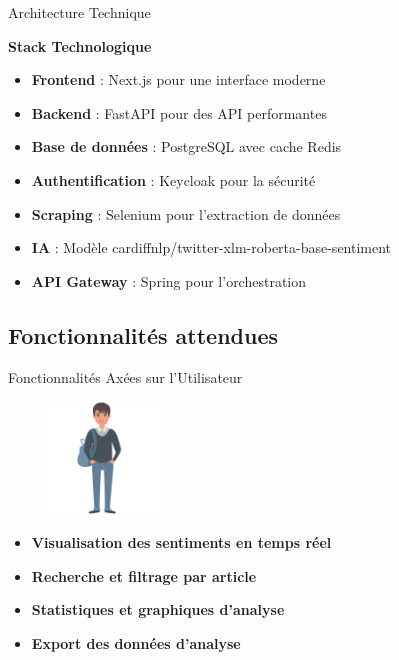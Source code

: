 \begin{frame}{Architecture Technique}
    \begin{block}{\centering \textbf{Stack Technologique}}
        \begin{itemize}
            \setlength\itemsep{0.6em}
            \item \textbf{Frontend} : Next.js pour une interface moderne
            \item \textbf{Backend} : FastAPI pour des API performantes
            \item \textbf{Base de données} : PostgreSQL avec cache Redis
            \item \textbf{Authentification} : Keycloak pour la sécurité
            \item \textbf{Scraping} : Selenium pour l'extraction de données
            \item \textbf{IA} : Modèle cardiffnlp/twitter-xlm-roberta-base-sentiment
            \item \textbf{API Gateway} : Spring pour l'orchestration
        \end{itemize}
    \end{block}
\end{frame}

\subsection{Fonctionnalités attendues}

\begin{frame}{Fonctionnalités Axées sur l'Utilisateur}
    \begin{figure}[H]
        \centering
        \includegraphics[height=3cm]{assets/images/user.png}
    \end{figure}
    \begin{itemize}
        \setlength\itemsep{0.8em} %
        \item \textbf{Visualisation des sentiments en temps réel}
        \item \textbf{Recherche et filtrage par article}
        \item \textbf{Statistiques et graphiques d'analyse}
        \item \textbf{Export des données d'analyse}
    \end{itemize}
\end{frame}

